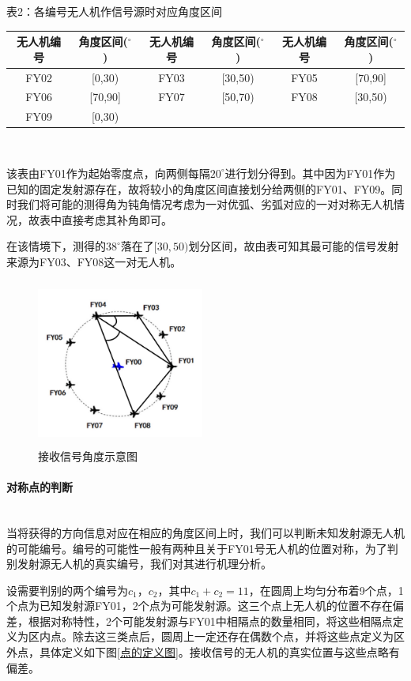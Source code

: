 \documentclass{ctexart}
\newcommand{\subsubsubsection}[1]{\paragraph{#1}\mbox{}\\}
\begin{document}
\begin{center}
  表2：各编号无人机作信号源时对应角度区间
  ~\\
    \begin{tabular}{|c|c|c|c|c|c|}
        \hline
        无人机编号&角度区间($^{\circ}$)&无人机编号&角度区间($^{\circ}$)&无人机编号&角度区间($^{\circ}$)\\
        \hline
        FY02&[0,30)&FY03&[30,50)&FY05&[70,90]\\
        \hline
        FY06&[70,90]&FY07&[50,70)&FY08&[30,50)\\
        \hline
        FY09&[0,30)& & & &\\    
        \hline
    \end{tabular}\\
\end{center}

该表由FY01作为起始零度点，向两侧每隔$20^{\circ}$进行划分得到。其中因为FY01作为已知的固定发射源存在，故将较小的角度区间直接划分给两侧的FY01、FY09。同时我们将可能的测得角为钝角情况考虑为一对优弧、劣弧对应的一对对称无人机情况，故表中直接考虑其补角即可。

在该情境下，测得的$38^{\circ}$落在了$[30,50)$划分区间，故由表可知其最可能的信号发射来源为FY03、FY08这一对无人机。

\begin{figure}[H]
  \centering
  \includegraphics[height=5.5cm,width=5.5cm]{pic/example_for_2.a.jpg}
  \caption{接收信号角度示意图}
  \end{figure}



\subsubsubsection{对称点的判断}

当将获得的方向信息对应在相应的角度区间上时，我们可以判断未知发射源无人机的可能编号。编号的可能性一般有两种且关于FY01号无人机的位置对称，为了判别发射源无人机的真实编号，我们对其进行机理分析。

设需要判别的两个编号为$c_1$，$c_2$，其中$c_1+c_2=11$，在圆周上均匀分布着9个点，1个点为已知发射源FY01，2个点为可能发射源。这三个点上无人机的位置不存在偏差，根据对称特性，2个可能发射源与FY01中相隔点的数量相同，将这些相隔点定义为区内点。除去这三类点后，圆周上一定还存在偶数个点，并将这些点定义为区外点，具体定义如下图\ref{点的定义图}。接收信号的无人机的真实位置与这些点略有偏差。
\end{document}

